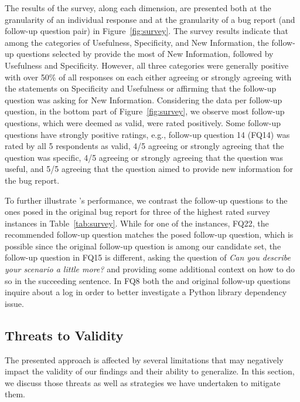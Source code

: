 The results of the survey, along each dimension, are presented both at the granularity of an individual response and at the granularity of a bug report (and follow-up question pair) in Figure~\ref{fig:survey}. The survey results indicate that among the categories of Usefulness, Specificity, and New Information, the follow-up questions selected by \evpi provide the most of New Information, followed by Usefulness and Specificity. However, all three categories were generally positive with over 50\% of all responses on each either agreeing or strongly agreeing with the statements on Specificity and Usefulness or affirming that the follow-up question was asking for New Information. Considering the data per follow-up question, in the bottom part of Figure~\ref{fig:survey}, we observe most follow-up questions, which were deemed as valid, were rated positively.  Some follow-up questions have strongly positive ratings, e.g., follow-up question 14 (FQ14) was rated by all 5 respondents as valid, 4/5 agreeing or strongly agreeing that the question was specific, 4/5 agreeing or strongly agreeing that the question was useful, and 5/5 agreeing that the question aimed to provide new information for the bug report.

To further illustrate \evpi's performance, we contrast the \evpi follow-up questions to the ones posed in the original bug report for three of the highest rated survey instances in Table~\ref{tab:survey}. While for one of the instances, FQ22, the recommended follow-up question matches the posed follow-up question, which is possible since the original follow-up question is among our candidate set, the follow-up question in FQ15 is different, asking the question of {\em Can you describe your scenario a little more?} and providing some additional context on how to do so in the succeeding sentence. In FQ8 both the \evpi and original follow-up questions inquire about a log in order to better investigate a Python library dependency issue.




\subsection{Threats to Validity}
The presented approach is affected by several limitations that may negatively impact the validity of our findings and their ability to generalize. In this section, we discuss those threats as well as strategies we have undertaken to mitigate them.


